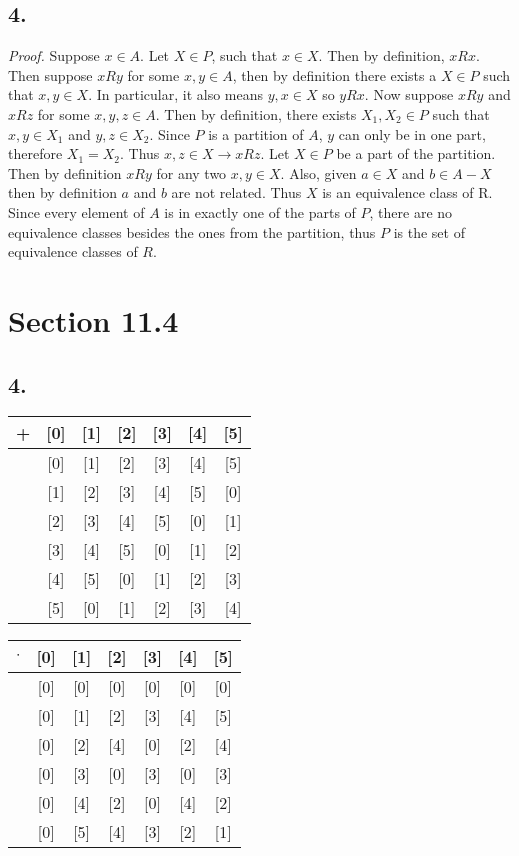 \documentclass[12pt]{article}
\begin{document}
\begin{minipage}[t]{0.40\textwidth}
	
\subsection*{4.}
\textit{Proof.} Suppose $ x\in A $. Let $ X\in P $, such that $ x\in X $. Then by definition, $ xRx $. Then suppose $ xRy $ for some $ x,y\in A $, then by definition there exists a $ X\in P $ such that $ x,y\in X $. In particular, it also means $ y,x\in X $ so $ yRx $. Now suppose $ xRy $ and $ xRz $ for some $ x,y,z\in A $. Then by definition, there exists $ X_1,X_2\in P $ such that $ x,y\in X_1 $ and $ y,z\in X_2 $. Since $ P $ is a partition of $ A $, $ y $ can only be in one part, therefore $ X_1=X_2 $. Thus $ x,z\in X  \rightarrow  xRz $. Let $ X\in P $ be a part of the partition. Then by definition $ xRy $ for any two $ x,y\in X $. Also, given $ a\in X $ and $ b\in A-X $ then by definition $ a $ and $ b $ are not related. Thus $ X $ is an equivalence class of R. Since every element of $ A $ is in exactly one of the parts of $ P $, there are no equivalence classes besides the ones from the partition, thus $ P $ is the set of equivalence classes of $ R $.  
	
\section*{Section 11.4}
\subsection*{4.}

\begin{tabular}{|c|c|c|c|c|c|c|}
	\hline
	+   & [0] & [1] & [2] & [3] & [4] & [5]\\
	\hline
	[0] & [0] & [1] & [2] & [3] & [4] & [5]\\
	\hline
	[1] & [1] & [2] & [3] & [4] & [5] & [0]\\
	\hline
	[2] & [2] & [3] & [4] & [5] & [0] & [1]\\
	\hline
	[3] & [3] & [4] & [5] & [0] & [1] & [2]\\
	\hline
	[4] & [4] & [5] & [0] & [1] & [2] & [3]\\
	\hline
	[5] & [5] & [0] & [1] & [2] & [3] & [4]\\
	\hline
\end{tabular}

\begin{tabular}{|c|c|c|c|c|c|c|}
	\hline
	$ \cdot $   & [0] & [1] & [2] & [3] & [4] & [5]\\
	\hline
	[0] & [0] & [0] & [0] & [0] & [0] & [0]\\
	\hline
	[1] & [0] & [1] & [2] & [3] & [4] & [5]\\
	\hline
	[2] & [0] & [2] & [4] & [0] & [2] & [4]\\
	\hline
	[3] & [0] & [3] & [0] & [3] & [0] & [3]\\
	\hline
	[4] & [0] & [4] & [2] & [0] & [4] & [2]\\
	\hline
	[5] & [0] & [5] & [4] & [3] & [2] & [1]\\
	\hline
\end{tabular}


\end{minipage}
\end{document}

